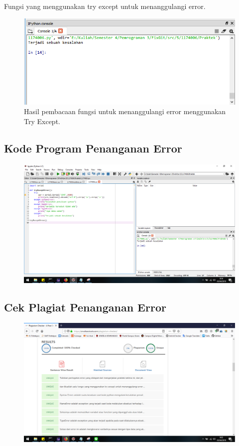 \hfill \break
Fungsi yang menggunakan try except untuk menanggulangi error.



\begin{figure}[H]
	\includegraphics[width=12cm]{figures/5/1174031/Praktek/5.png}
	\centering
	\caption{Hasil pembacaan fungsi untuk menanggulangi error menggunakan Try Except.}
\end{figure}

\subsection{Kode Program Penanganan Error}
\begin{figure}[H]
	\includegraphics[width=12cm]{figures/5/1174031/Praktek/error.png}
	\centering
\end{figure}

\subsection{Cek Plagiat Penanganan Error}
\begin{figure}[H]
	\includegraphics[width=12cm]{figures/5/1174031/Praktek/plagiaterror.png}
	\centering
\end{figure}